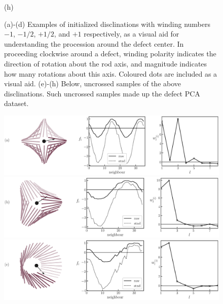 \begin{figure}[!t]
\begin{minipage}[t]{0.25\textwidth}
		(h)
	\end{minipage}%
	\caption{(a)-(d) Examples of initialized disclinations with winding numbers $-1$, $-1/2$, $+1/2$, and $+1$ respectively, as a visual aid for understanding the procession around the defect center. In proceeding clockwise around a defect, winding polarity indicates the direction of rotation about the rod axis, and magnitude indicates how many rotations about this axis. Coloured dots are included as a visual aid. (e)-(h) Below, uncrossed samples of the above disclinations. Such uncrossed samples made up the defect PCA dataset.
	}
	\label{FIG:defects_pure}
\end{figure}




\begin{figure}[!t]
	\centering
	\begin{minipage}[c]{\columnwidth}
		\centering
		\includegraphics[width=\columnwidth]{./figs/prob_stats_minusone_small_0.eps}\\
		\vspace{0.5cm}
		\includegraphics[width=\columnwidth]{./figs/prob_stats_minushalf_small_0.eps}\\
		\vspace{0.5cm}
		\includegraphics[width=\columnwidth]{./figs/prob_stats_plushalf_small_0.eps}\\
		\vspace{0.5cm}

\end{minipage}
\end{figure}
